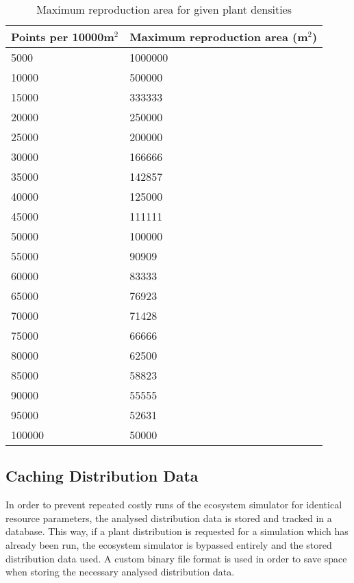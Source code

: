 \begin{table}[]
  \centering
	    \begin{tabular}{|p{7cm}|p{8cm}|}
		\hline
		\textbf{Points per 10000m$^{2}$} & \textbf{Maximum reproduction area (m$^{2}$)}\\
		\hline
		5000	  &  1000000\\
		\hline
		10000	  &  500000\\
		\hline
		15000 &	333333\\
		\hline
		20000 &	250000\\
		\hline
		25000 &	200000\\
		\hline
		30000 &	166666\\
		\hline
		35000 &	142857\\
		\hline
		40000 &	125000\\
		\hline
		45000 &	111111\\
		\hline
		50000 &	100000\\
		\hline
		55000 &	90909\\
		\hline
		60000 &	83333\\
		\hline
		65000 &	76923\\
		\hline
		70000 &	71428\\
		\hline
		75000 &	66666\\
		\hline
		80000 &	62500\\
		\hline
		85000 &	58823\\
		\hline
		90000 &	55555\\
		\hline
		95000 &	52631\\
		\hline
		100000 & 50000\\
		\hline
		\end{tabular}
		\caption{Maximum reproduction area for given plant densities}
	  \label{tab:maximum_reproduction_areas}
\end{table}

\subsection{Caching Distribution Data}

In order to prevent repeated costly runs of the ecosystem simulator for identical resource parameters, the analysed distribution data is stored and tracked in a database. This way, if a plant distribution is requested for a simulation which has already been run, the ecosystem simulator is bypassed entirely and the stored distribution data used. A custom binary file format is used in order to save space when storing the necessary analysed distribution data.

